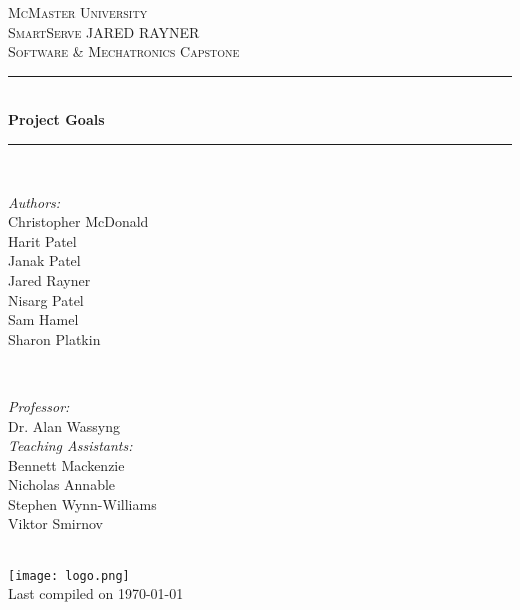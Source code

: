 \documentclass[11pt]{article}
\begin{document}
\begin{titlepage}
	\newcommand{\HRule}{\rule{\linewidth}{0.2mm}}
	\begin{center}
	\textsc{\LARGE McMaster University}\\[1.5cm]
	
	\textsc{\Large SmartServe JARED RAYNER}\\[0.5cm]
	\textsc{\large Software \& Mechatronics Capstone}\\[0.5cm] 

	\HRule\\[0.4cm]
		{\huge\bfseries Project Goals}\\[0.4cm]
	\HRule\\[0.4cm]
	
	\begin{minipage}[t][][t]{0.5\textwidth}
		\begin{flushleft} \large
			\emph{Authors:}\\
			Christopher McDonald\\
			Harit Patel \\
			Janak Patel \\
			Jared Rayner  \\
			Nisarg Patel  \\
			Sam Hamel \\
			Sharon Platkin \\
		\end{flushleft}
	\end{minipage}
	~
	\begin{minipage}[t][][t]{0.4\textwidth}
		\begin{flushright} \large
			\emph{Professor:} \\
			Dr. Alan Wassyng \\[0.4cm]
			\emph{Teaching Assistants:} \\
			Bennett Mackenzie \\ 
			Nicholas Annable \\ 
			Stephen Wynn-Williams \\ 
			Viktor Smirnov
		\end{flushright}
	\end{minipage}\\[2cm]
	
	\texttt{[image: logo.png]} \\
	{\large Last compiled on \today}
	\end{center}

\end{titlepage}

\tableofcontents
\listoffigures
\end{document}
